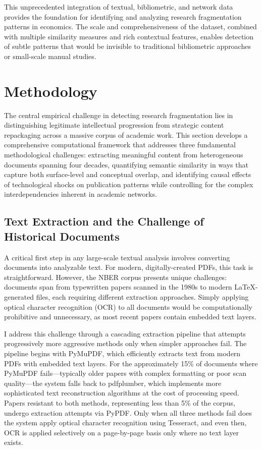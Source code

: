 \documentclass[12pt]{article}
\begin{document}
This unprecedented integration of textual, bibliometric, and network data provides the foundation for identifying and analyzing research fragmentation patterns in economics. The scale and comprehensiveness of the dataset, combined with multiple similarity measures and rich contextual features, enables detection of subtle patterns that would be invisible to traditional bibliometric approaches or small-scale manual studies.

\section{Methodology}
\label{sec:methodology}

The central empirical challenge in detecting research fragmentation lies in distinguishing legitimate intellectual progression from strategic content repackaging across a massive corpus of academic work. This section develops a comprehensive computational framework that addresses three fundamental methodological challenges: extracting meaningful content from heterogeneous documents spanning four decades, quantifying semantic similarity in ways that capture both surface-level and conceptual overlap, and identifying causal effects of technological shocks on publication patterns while controlling for the complex interdependencies inherent in academic networks.

\subsection{Text Extraction and the Challenge of Historical Documents}

A critical first step in any large-scale textual analysis involves converting documents into analyzable text. For modern, digitally-created PDFs, this task is straightforward. However, the NBER corpus presents unique challenges: documents span from typewritten papers scanned in the 1980s to modern LaTeX-generated files, each requiring different extraction approaches. Simply applying optical character recognition (OCR) to all documents would be computationally prohibitive and unnecessary, as most recent papers contain embedded text layers.

I address this challenge through a cascading extraction pipeline that attempts progressively more aggressive methods only when simpler approaches fail. The pipeline begins with PyMuPDF, which efficiently extracts text from modern PDFs with embedded text layers. For the approximately 15\% of documents where PyMuPDF fails—typically older papers with complex formatting or poor scan quality—the system falls back to pdfplumber, which implements more sophisticated text reconstruction algorithms at the cost of processing speed. Papers resistant to both methods, representing less than 5\% of the corpus, undergo extraction attempts via PyPDF. Only when all three methods fail does the system apply optical character recognition using Tesseract, and even then, OCR is applied selectively on a page-by-page basis only where no text layer exists.
\end{document}
